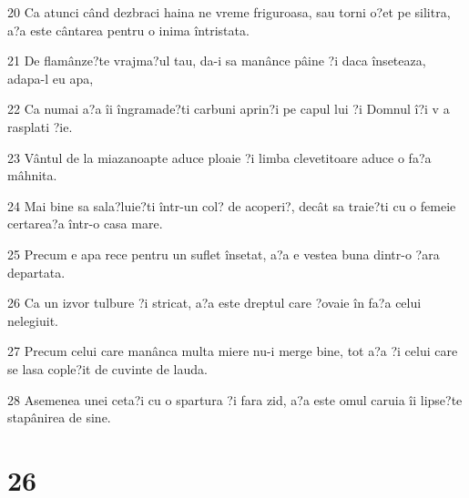 \par 20 Ca atunci când dezbraci haina ne vreme friguroasa, sau torni o?et pe silitra, a?a este cântarea pentru o inima întristata.
\par 21 De flamânze?te vrajma?ul tau, da-i sa manânce pâine ?i daca înseteaza, adapa-l eu apa,
\par 22 Ca numai a?a îi îngramade?ti carbuni aprin?i pe capul lui ?i Domnul î?i v a rasplati ?ie.
\par 23 Vântul de la miazanoapte aduce ploaie ?i limba clevetitoare aduce o fa?a mâhnita.
\par 24 Mai bine sa sala?luie?ti într-un col? de acoperi?, decât sa traie?ti cu o femeie certarea?a într-o casa mare.
\par 25 Precum e apa rece pentru un suflet însetat, a?a e vestea buna dintr-o ?ara departata.
\par 26 Ca un izvor tulbure ?i stricat, a?a este dreptul care ?ovaie în fa?a celui nelegiuit.
\par 27 Precum celui care manânca multa miere nu-i merge bine, tot a?a ?i celui care se lasa cople?it de cuvinte de lauda.
\par 28 Asemenea unei ceta?i cu o spartura ?i fara zid, a?a este omul caruia îi lipse?te stapânirea de sine.

\chapter{26}

